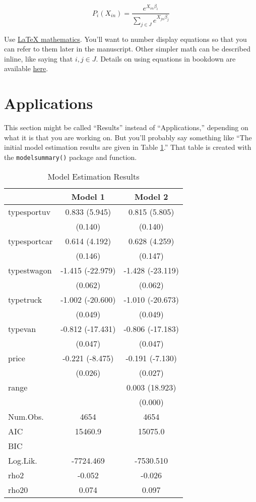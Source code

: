 \documentclass[3p, authoryear]{elsarticle} %
\begin{document}
\begin{equation}
  P_i(X_{in}) = \frac{e^{X_{in}\beta_i}}{\sum_{j \in J}e^{X_{jn}\beta_j}}
  \label{eq:mnl}
\end{equation}

Use \href{https://www.overleaf.com/learn/latex/mathematical_expressions}{LaTeX mathematics}.
You'll want to number display equations so that you can
refer to them later in the manuscript. Other simpler math can be described inline,
like saying that \(i, j \in J\). Details on using equations in bookdown are available
\href{https://bookdown.org/yihui/bookdown/markdown-extensions-by-bookdown.html}{here}.

\hypertarget{applications}{%
\section{Applications}\label{applications}}

This section might be called ``Results'' instead of ``Applications,'' depending
on what it is that you are working on. But you'll probably say something like
``The initial model estimation results are given in Table \ref{tab:estimation-results}.''
That table is created with the \texttt{modelsummary()} package and function.

\begin{table}

\caption{\label{tab:estimation-results}Model Estimation Results}
\centering
\begin{tabular}[t]{lcc}
\toprule
  & Model 1 & Model 2\\
\midrule
typesportuv & 0.833 (5.945) & 0.815 (5.805)\\
 & (0.140) & (0.140)\\
typesportcar & 0.614 (4.192) & 0.628 (4.259)\\
 & (0.146) & (0.147)\\
typestwagon & -1.415 (-22.979) & -1.428 (-23.119)\\
 & (0.062) & (0.062)\\
typetruck & -1.002 (-20.600) & -1.010 (-20.673)\\
 & (0.049) & (0.049)\\
typevan & -0.812 (-17.431) & -0.806 (-17.183)\\
 & (0.047) & (0.047)\\
price & -0.221 (-8.475) & -0.191 (-7.130)\\
 & (0.026) & (0.027)\\
range &  & 0.003 (18.923)\\
 &  & (0.000)\\
\midrule
Num.Obs. & 4654 & 4654\\
AIC & 15460.9 & 15075.0\\
BIC &  & \\
Log.Lik. & -7724.469 & -7530.510\\
rho2 & -0.052 & -0.026\\
rho20 & 0.074 & 0.097\\
\bottomrule
\end{tabular}
\end{table}
\end{document}
